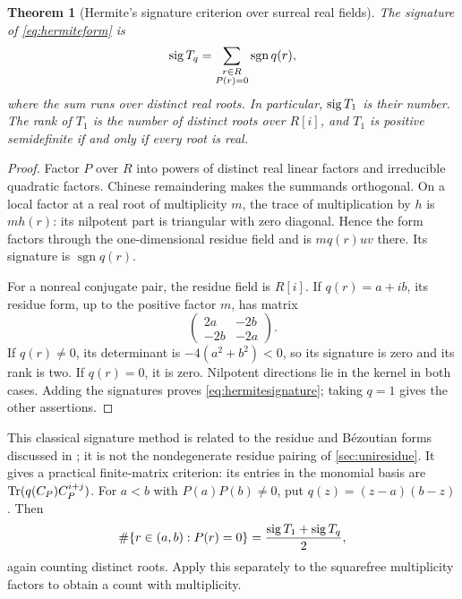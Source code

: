 \documentclass[11pt,letterpaper,oneside]{article}
\numberwithin{equation}{section}
\newtheorem{theorem}{Theorem}[section]
\theoremstyle{definition}
\theoremstyle{remark}\newtheorem{remark}[theorem]{Remark}
\newcommand{\sgn}{\operatorname{sgn}}\newcommand{\Hom}{\operatorname{Hom}}
\begin{document}
\begin{theorem}[Hermite's signature criterion over surreal real fields]\label{thm:hermite}
The signature of \eqref{eq:hermiteform} is
\begin{equation}\label{eq:hermitesignature}
 \sig T_q=\sum_{\substack{r\in R\\P(r)=0}}\sgn q(r),
\end{equation}
where the sum runs over \emph{distinct} real roots. In particular,
$\operatorname{sig} T_1$ is their number. The rank of $T_1$ is the number of distinct
roots over $R[i]$, and $T_1$ is positive semidefinite if and only if every
root is real.
\end{theorem}
\begin{proof}
Factor $P$ over $R$ into powers of distinct real linear factors and
irreducible quadratic factors. Chinese remaindering makes the summands
orthogonal. On a local factor at a real root of multiplicity $m$, the
trace of multiplication by $h$ is $m h(r)$: its nilpotent part is
triangular with zero diagonal. Hence the form factors through the
one-dimensional residue field and is $m q(r)uv$ there. Its signature is
$\sgn q(r)$.

For a nonreal conjugate pair, the residue field is $R[i]$. If $q(r)=a+ib$,
its residue form, up to the positive factor $m$, has matrix
\[
 \begin{pmatrix}2a&-2b\\-2b&-2a\end{pmatrix}.
\]
If $q(r)\ne0$, its determinant is $-4(a^2+b^2)<0$, so its signature is
zero and its rank is two. If $q(r)=0$, it is zero. Nilpotent directions
lie in the kernel in both cases. Adding the signatures proves
\eqref{eq:hermitesignature}; taking $q=1$ gives the other assertions.
\end{proof}

This classical signature method is related to the residue and B\'ezoutian
forms discussed in \cite{BCRS}; it is not the nondegenerate residue pairing
of \cref{sec:uniresidue}. It gives a practical finite-matrix criterion:
its entries in the monomial basis are $\operatorname{Tr}(q(C_P)C_P^{i+j})$.
For $a<b$ with $P(a)P(b)\ne0$, put $q(z)=(z-a)(b-z)$. Then
\begin{equation}\label{eq:intervalcount}
 \#\{r\in(a,b):P(r)=0\}
 =\frac{\operatorname{sig} T_1+\operatorname{sig} T_q}{2},
\end{equation}
again counting distinct roots. Apply this separately to the squarefree
multiplicity factors to obtain a count with multiplicity.
\end{document}
